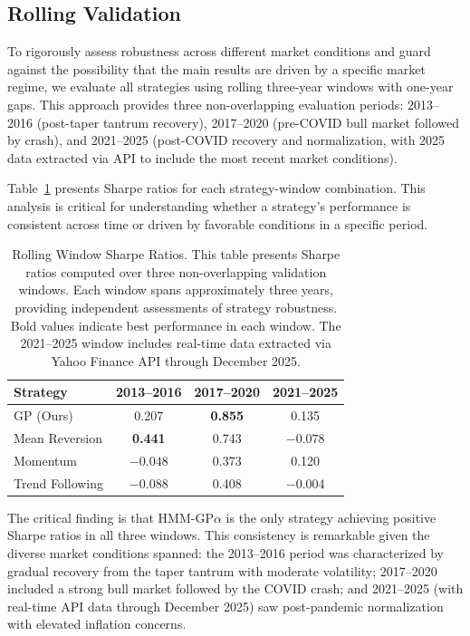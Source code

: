 \documentclass{ieeeaccess}
\begin{document}
\subsection{Rolling Validation}

To rigorously assess robustness across different market conditions and guard against the possibility that the main results are driven by a specific market regime, we evaluate all strategies using rolling three-year windows with one-year gaps. This approach provides three non-overlapping evaluation periods: 2013--2016 (post-taper tantrum recovery), 2017--2020 (pre-COVID bull market followed by crash), and 2021--2025 (post-COVID recovery and normalization, with 2025 data extracted via API to include the most recent market conditions).

Table~\ref{tab:rolling} presents Sharpe ratios for each strategy-window combination. This analysis is critical for understanding whether a strategy's performance is consistent across time or driven by favorable conditions in a specific period.

\begin{table}[!htbp]
\centering
\caption{Rolling Window Sharpe Ratios. This table presents Sharpe ratios computed over three non-overlapping validation windows. Each window spans approximately three years, providing independent assessments of strategy robustness. Bold values indicate best performance in each window. The 2021--2025 window includes real-time data extracted via Yahoo Finance API through December 2025.}
\label{tab:rolling}
\begin{tabular}{lccc}
\toprule
\textbf{Strategy} & \textbf{2013--2016} & \textbf{2017--2020} & \textbf{2021--2025} \\
\midrule
GP (Ours) & 0.207 & \textbf{0.855} & 0.135 \\
Mean Reversion & \textbf{0.441} & 0.743 & $-0.078$ \\
Momentum & $-0.048$ & 0.373 & 0.120 \\
Trend Following & $-0.088$ & 0.408 & $-0.004$ \\
\bottomrule
\end{tabular}
\end{table}

The critical finding is that HMM-GP$\alpha$ is the only strategy achieving positive Sharpe ratios in all three windows. This consistency is remarkable given the diverse market conditions spanned: the 2013--2016 period was characterized by gradual recovery from the taper tantrum with moderate volatility; 2017--2020 included a strong bull market followed by the COVID crash; and 2021--2025 (with real-time API data through December 2025) saw post-pandemic normalization with elevated inflation concerns.
\end{document}
